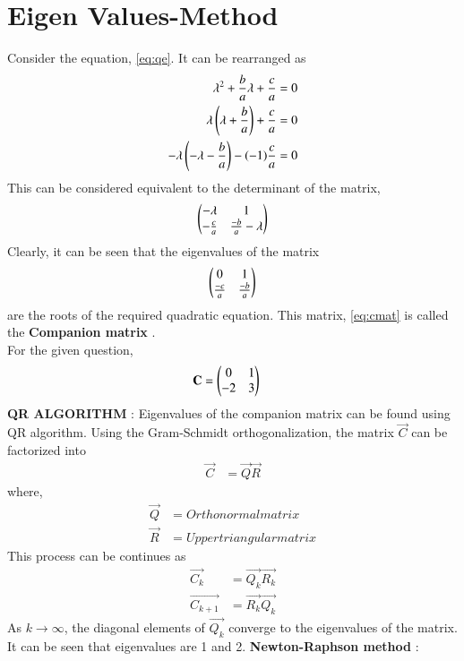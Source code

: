 \documentclass[journal,12pt,onecolumn]{IEEEtran}
\theoremstyle{remark}
\begin{document}
\section{Eigen Values-Method}
Consider the equation, \eqref{eq:qe}. It can be rearranged as
	\begin{align}
		\lambda ^2 + \frac{b}{a} \lambda + \frac{c}{a} &= 0 \\
		\lambda \left(\lambda + \frac{b}{a}\right) + \frac{c}{a} &= 0 \\
		-\lambda \left(-\lambda - \frac{b}{a}\right) - (-1) \frac{c}{a} &= 0
	\end{align}
	This can be considered equivalent to the determinant of the matrix, 
	\begin{align}
		\begin{pmatrix}-\lambda & 1 \\ -\frac{c}{a} & \frac{-b}{a} - \lambda\end{pmatrix} \label{eq:matrix}
	\end{align}
	Clearly, it can be seen that the eigenvalues of the matrix 
	\begin{align}
		\begin{pmatrix}0 & 1 \\ \frac{-c}{a} & \frac{-b}{a}\end{pmatrix} \label{eq:cmat}
	\end{align}
	are the roots of the required quadratic equation. This matrix, \eqref{eq:cmat} is called the \textbf{Companion matrix} . \\
	For the given question, 
	\begin{align}
		\mathbf{C} &= \begin{pmatrix}0 & 1 \\ -2 & 3\end{pmatrix}
	\end{align}
	\textbf{QR ALGORITHM} :
	Eigenvalues of the companion matrix can be found using QR algorithm. Using the Gram-Schmidt orthogonalization, the matrix $\vec{C}$ can be factorized into
	\begin{align}
		\vec{C} &= \vec{Q} \vec{R}
	\end{align}
	where, 
	\begin{align}
		\vec{Q} &= Orthonormal matrix \\
		\vec{R} &= Upper triangular matrix
	\end{align}
	This process can be continues as
	\begin{align}
		\vec{C_{k}} &= \vec{Q_{k}} \vec{R_{k}} \\
		\vec{C_{k+1}} &= \vec{R_{k}} \vec{Q_{k}}
	\end{align}
	As $k \to \infty$, the diagonal elements of $\vec{Q_{k}}$ converge to the eigenvalues of the matrix.
	It can be seen that eigenvalues are 1 and 2.
	\textbf{Newton-Raphson method} : \\
\end{document}
